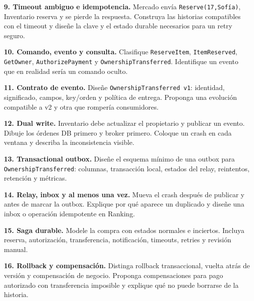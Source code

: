 \documentclass[variant=guia,cover=institutional,mode=screen]{ua-engineering-v6-article}
\begin{document}
\begin{uaexercise}
\textbf{9. Timeout ambiguo e idempotencia.} Mercado envía \texttt{Reserve(17,Sofía)}, Inventario reserva y se pierde la respuesta. Construya las historias compatibles con el timeout y diseñe la clave y el estado durable necesarios para un retry seguro.
\end{uaexercise}
\begin{uaexercise}
\textbf{10. Comando, evento y consulta.} Clasifique \texttt{ReserveItem}, \texttt{ItemReserved}, \texttt{GetOwner}, \texttt{AuthorizePayment} y \texttt{OwnershipTransferred}. Identifique un evento que en realidad sería un comando oculto.
\end{uaexercise}
\begin{uaexercise}
\textbf{11. Contrato de evento.} Diseñe \texttt{OwnershipTransferred v1}: identidad, significado, campos, key/orden y política de entrega. Proponga una evolución compatible a v2 y otra que rompería consumidores.
\end{uaexercise}
\begin{uaexercise}
\textbf{12. Dual write.} Inventario debe actualizar el propietario y publicar un evento. Dibuje los órdenes DB primero y broker primero. Coloque un crash en cada ventana y describa la inconsistencia visible.
\end{uaexercise}
\begin{uaexercise}
\textbf{13. Transactional outbox.} Diseñe el esquema mínimo de una outbox para \texttt{OwnershipTransferred}: columnas, transacción local, estados del relay, reintentos, retención y métricas.
\end{uaexercise}
\begin{uaexercise}
\textbf{14. Relay, inbox y al menos una vez.} Mueva el crash después de publicar y antes de marcar la outbox. Explique por qué aparece un duplicado y diseñe una inbox o operación idempotente en Ranking.
\end{uaexercise}
\begin{uaexercise}
\textbf{15. Saga durable.} Modele la compra con estados normales e inciertos. Incluya reserva, autorización, transferencia, notificación, timeouts, retries y revisión manual.
\end{uaexercise}
\begin{uaexercise}
\textbf{16. Rollback y compensación.} Distinga rollback transaccional, vuelta atrás de versión y compensación de negocio. Proponga compensaciones para pago autorizado con transferencia imposible y explique qué no puede borrarse de la historia.
\end{uaexercise}
\end{document}
